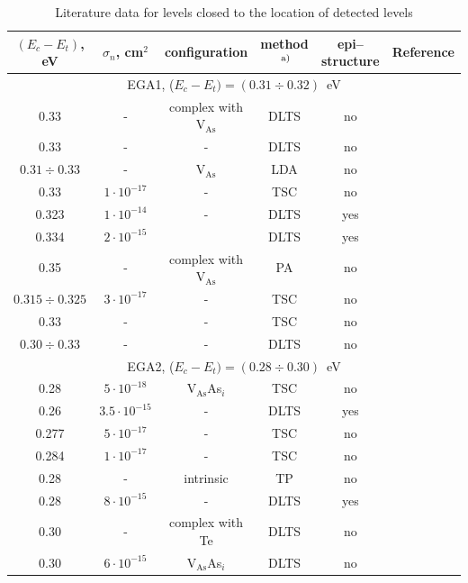 \documentclass[final,3p,times,twocolumn,authoryear]{elsarticle}
\begin{document}
\begin{table}
\caption{\label{tabEGA1}Literature data for levels closed to the location of detected levels
}
\center
\renewcommand{\arraystretch}{0.65}
\begin{tabular}{cccccc}
\hline
$(E_c-E_t)$, eV &$\sigma_n$, cm$^2$&configuration&method$\textsuperscript{ a)}$&epi--structure&Reference\\
\hline
\multicolumn{6}{c}{EGA1, ($E_c-E_t)=(0.31\div0.32)$~eV}\\
0.33&-&complex with V$_\mathrm{As}$&DLTS&no&\cite{EL6:Richter}\\%
0.33&-&-&DLTS&no&\cite{Neild1991}\\ %
$0.31\div0.33$&-&V$_\mathrm{As}$&LDA&no&\cite{EL6:Schultz}\\ %
0.33&$1\cdot10^{-17}$&-&TSC&no&\cite{Pavlovic2000}\\ %
0.323&$1\cdot10^{-14}$&-&DLTS&yes&\cite{Yousefi1995}\\ %
0.334&$2\cdot10^{-15}$&&DLTS&yes&\cite{Yousefi1995}\\ %
0.35&-&complex with V$_\mathrm{As}$&PA&no&\cite{EL6:Kuisma}\\ %
$0.315\div0.325$&$3\cdot10^{-17}$&-&TSC&no&\cite{Pavlovic:GaAs}\\ %
0.33&-&-&TSC&no&\cite{Tomozane:GaAs}\\ %
$0.30\div0.33$&-&-&DLTS&no&\cite{Lang:GaAs}\\ %
\multicolumn{6}{c}{EGA2, ($E_c-E_t)=(0.28\div0.30)$~eV}\\
0.28&$5\cdot10^{-18}$&V$_\mathrm{As}$As$_i$&TSC&no&\cite{Pavlovic2000}\\ %
0.26&$3.5\cdot10^{-15}$&-&DLTS&yes&\cite{Yousefi1995}\\ %
0.277&$5\cdot10^{-17}$&-&TSC&no&\cite{Pavlovic:GaAs}\\ %
0.284&$1\cdot10^{-17}$&-&TSC&no&\cite{Pavlovic:GaAs}\\ %
0.28&-&intrinsic&TP&no&\cite{Abele:GaAs}\\ %
0.28&$8\cdot10^{-15}$&-&DLTS&yes&\cite{Mircea1975}\\ %
0.30&-&complex with Te&DLTS&no&\cite{KolFTP1994En}\\ %
0.30&$6\cdot10^{-15}$&V$_\mathrm{As}$As$_i$&DLTS&no&\cite{Pons}\\ %

\end{tabular}
\end{table}
\end{document}
